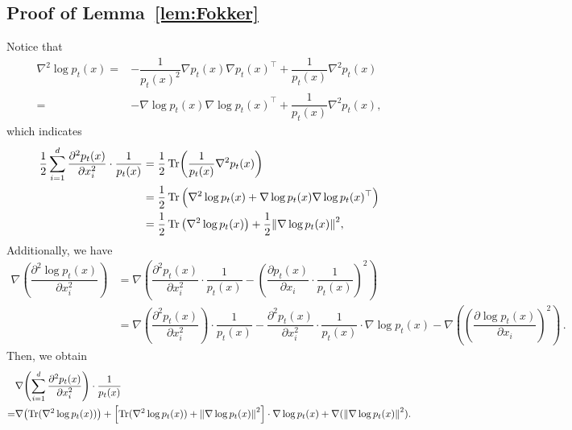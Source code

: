 \subsection{Proof of Lemma~\ref{lem:Fokker}}
Notice that
\begin{align*}
    \nabla^2\log p_t(x)=&-\dfrac{1}{p_t(x)^2}\nabla p_t(x)\nabla p_t(x)^\top+\dfrac{1}{p_t(x)}\nabla^2p_t(x)\\
    =&-\nabla\log p_t(x)\nabla\log p_t(x)^\top+\dfrac{1}{p_t(x)}\nabla^2 p_t(x),
\end{align*}
which indicates
\begin{align*}
    \dfrac{1}{2}\sum_{i=1}^d\dfrac{\partial^2 p_t(x)}{\partial x_i^2}\cdot\dfrac{1}{p_t(x)}
    &=\dfrac{1}{2}\Tr\left(\dfrac{1}{p_t(x)}\nabla^2p_t(x)\right)\\
    &=\dfrac{1}{2}\Tr\Big(\nabla^2\log p_t(x)+\nabla\log p_t(x)\nabla\log p_t(x)^\top\Big)\\
    &=\dfrac{1}{2}\Tr\big(\nabla^2\log p_t(x)\big)+\dfrac{1}{2}\l|\nabla\log p_t(x)\r|^2,
\end{align*}
Additionally, we have
\begin{align*}
    \nabla\left(\dfrac{\partial^2\log p_t(x)}{\partial x_i^2}\right)&=\nabla\left(\dfrac{\partial^2p_t(x)}{\partial x_i^2}\cdot\dfrac{1}{p_t(x)}-\left(\dfrac{\partial p_t(x)}{\partial x_i}\cdot\dfrac{1}{p_t(x)}\right)^2\right)\\
    &=\nabla\left(\dfrac{\partial^2p_t(x)}{\partial x_i^2}\right)\cdot\dfrac{1}{p_t(x)}-\dfrac{\partial^2p_t(x)}{\partial x_i^2}\cdot\dfrac{1}{p_t(x)}\cdot\nabla\log p_t(x)-\nabla\left(\left(\dfrac{\partial\log p_t(x)}{\partial x_i}\right)^2\right)\,.
\end{align*}
Then, we obtain
\begin{align*}
    &\nabla\left(\sum_{i=1}^d\dfrac{\partial^2p_t(x)}{\partial x_i^2}\right)\cdot\dfrac{1}{p_t(x)}\\
    =&\nabla\left(\Tr(\nabla^2\log p_t(x))\right)+\left[\Tr(\nabla^2\log p_t(x))+\l|\nabla\log p_t(x)\r|^2\right]\cdot\nabla\log p_t(x)+\nabla(\l|\nabla\log p_t(x)\r|^2).
\end{align*}


